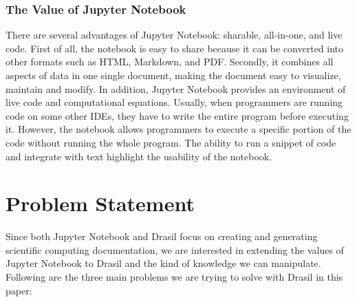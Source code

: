 \subsubsection{The Value of Jupyter Notebook}
There are several advantages of Jupyter Notebook: sharable, all-in-one, and 
live code. First of all, the notebook is easy to share because it can be 
converted into other formats such as HTML, Markdown, and PDF. Secondly, it 
combines all aspects of data in one single document, making the document easy 
to visualize, maintain and modify. In addition, Jupyter Notebook provides an 
environment of live code and computational equations. Usually, when programmers 
are running code on some other IDEs, they have to write the entire program 
before executing it. However, the notebook allows programmers to execute a 
specific portion of the code without running the whole program. The ability to 
run a snippet of code and integrate with text highlight the usability of the 
notebook.

\section{Problem Statement}
Since both Jupyter Notebook and Drasil focus on creating and generating 
scientific computing documentation, we are interested in extending the values 
of Jupyter Notebook to Drasil and the kind of knowledge we can manipulate. 
Following are the three main problems we are trying to solve with Drasil in 
this paper:

